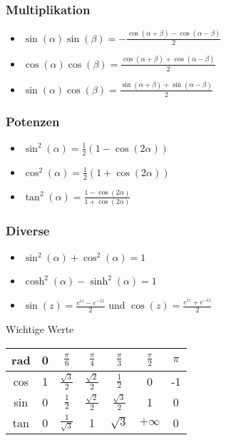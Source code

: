 \documentclass[a4paper,10pt]{article}
\begin{document}
\subsubsection{Multiplikation}
\begin{itemize}
 \item $\sin(\alpha) \sin(\beta) = -\frac{\cos(\alpha + \beta) - \cos(\alpha - \beta)}{2}$
 \item $\cos(\alpha) \cos(\beta) =  \frac{\cos(\alpha + \beta) + \cos(\alpha - \beta)}{2}$
 \item $\sin(\alpha) \cos(\beta) =  \frac{\sin(\alpha + \beta) + \sin(\alpha - \beta)}{2}$
\end{itemize}

\subsubsection{Potenzen}
\begin{itemize}
 \item $\sin^2(\alpha) = \frac{1}{2}(1-\cos(2\alpha))$
 \item $\cos^2(\alpha) = \frac{1}{2}(1+\cos(2\alpha))$
 \item $\tan^2(\alpha) = \frac{1-\cos(2\alpha)}{1+\cos(2\alpha)}$
\end{itemize}

\subsubsection{Diverse}

\begin{itemize}
 \item $\sin^2(\alpha) + \cos^2(\alpha) = 1$
 \item $\cosh^2(\alpha) - \sinh^2(\alpha) = 1$
 \item $\sin(z) = \frac{e^{iz} - e^{-iz}}{2}$ und $\cos(z) = \frac{e^{iz} + e^{-iz}}{2}$
\end{itemize}


\begin{mainbox}{Wichtige Werte}
\begin{center} 
 \begin{tabular}{c|cccccc}
  rad & 0 & $\frac{\pi}{6}$ & $\frac{\pi}{4}$ & $\frac{\pi}{3}$ & $\frac{\pi}{2}$ & $\pi$ \\
  \midrule
  cos & 1 & $\frac{\sqrt{3}}{2}$ & $\frac{\sqrt{2}}{2}$ & $\frac{1}{2}$ & 0 & -1 \\
  sin & 0 & $\frac{1}{2}$ & $\frac{\sqrt{2}}{2}$ & $\frac{\sqrt{3}}{2}$ & 1 & 0 \\
  tan & 0 & $\frac{1}{\sqrt{3}}$ & 1 & $\sqrt{3}$ & $+\infty$ & 0 \\

 \end{tabular}
\end{center}
\end{mainbox}
\end{document}
